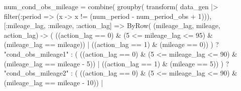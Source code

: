 \documentclass[
  letterpaper,
  DIV=11,
  numbers=noendperiod]{scrreprt}
\newenvironment{Shaded}{\begin{snugshade}}{\end{snugshade}}
\newcommand{\FloatTok}[1]{\textcolor[rgb]{0.68,0.00,0.00}{#1}}
\newcommand{\FunctionTok}[1]{\textcolor[rgb]{0.28,0.35,0.67}{#1}}
\newcommand{\NormalTok}[1]{\textcolor[rgb]{0.00,0.23,0.31}{#1}}
\newcommand{\OperatorTok}[1]{\textcolor[rgb]{0.37,0.37,0.37}{#1}}
\newcommand{\StringTok}[1]{\textcolor[rgb]{0.13,0.47,0.30}{#1}}
\begin{document}
\begin{Shaded}
\begin{Highlighting}[]
\NormalTok{num\_cond\_obs\_mileage }\OperatorTok{=} \FunctionTok{combine}\NormalTok{(}
    \FunctionTok{groupby}\NormalTok{(}
        \FunctionTok{transform}\NormalTok{(}
\NormalTok{            data\_gen }\OperatorTok{|\textgreater{}}
                \FunctionTok{filter}\NormalTok{(}\OperatorTok{:}\NormalTok{period }\OperatorTok{=\textgreater{}}\NormalTok{ (x }\OperatorTok{{-}\textgreater{}}\NormalTok{ x }\OperatorTok{!=}\NormalTok{ (num\_period }\OperatorTok{{-}}\NormalTok{ num\_period\_obs }\OperatorTok{+} \FloatTok{1}\NormalTok{))),}
\NormalTok{            [}\OperatorTok{:}\NormalTok{mileage\_lag, }\OperatorTok{:}\NormalTok{mileage, }\OperatorTok{:}\NormalTok{action\_lag] }\OperatorTok{=\textgreater{}}
            \FunctionTok{ByRow}\NormalTok{(}
\NormalTok{                (mileage\_lag, mileage, action\_lag) }\OperatorTok{{-}\textgreater{}}
\NormalTok{                (}
\NormalTok{                    ((action\_lag }\OperatorTok{==} \FloatTok{0}\NormalTok{) }\OperatorTok{\&}\NormalTok{ (}\FloatTok{5} \OperatorTok{\textless{}=}\NormalTok{ mileage\_lag }\OperatorTok{\textless{}=} \FloatTok{95}\NormalTok{) }\OperatorTok{\&}\NormalTok{ (mileage\_lag }\OperatorTok{==}\NormalTok{ mileage)) }\OperatorTok{|}
\NormalTok{                    ((action\_lag }\OperatorTok{==} \FloatTok{1}\NormalTok{) }\OperatorTok{\&}\NormalTok{ (mileage }\OperatorTok{==} \FloatTok{0}\NormalTok{))}
\NormalTok{                    ) ? }\StringTok{"cond\_obs\_mileage1"} \OperatorTok{:}
\NormalTok{                (}
\NormalTok{                    ((action\_lag }\OperatorTok{==} \FloatTok{0}\NormalTok{) }\OperatorTok{\&}\NormalTok{ (}\FloatTok{5} \OperatorTok{\textless{}=}\NormalTok{ mileage\_lag }\OperatorTok{\textless{}=} \FloatTok{90}\NormalTok{) }\OperatorTok{\&}\NormalTok{ (mileage\_lag }\OperatorTok{==}\NormalTok{ mileage }\OperatorTok{{-}} \FloatTok{5}\NormalTok{)) }\OperatorTok{|}
\NormalTok{                    ((action\_lag }\OperatorTok{==} \FloatTok{1}\NormalTok{) }\OperatorTok{\&}\NormalTok{ (mileage }\OperatorTok{==} \FloatTok{5}\NormalTok{))}
\NormalTok{                    ) ? }\StringTok{"cond\_obs\_mileage2"} \OperatorTok{:}
\NormalTok{                (}
\NormalTok{                    ((action\_lag }\OperatorTok{==} \FloatTok{0}\NormalTok{) }\OperatorTok{\&}\NormalTok{ (}\FloatTok{5} \OperatorTok{\textless{}=}\NormalTok{ mileage\_lag }\OperatorTok{\textless{}=} \FloatTok{90}\NormalTok{) }\OperatorTok{\&}\NormalTok{ (mileage\_lag }\OperatorTok{==}\NormalTok{ mileage }\OperatorTok{{-}} \FloatTok{10}\NormalTok{)) }\OperatorTok{|}

\end{Highlighting}
\end{Shaded}
\end{document}
